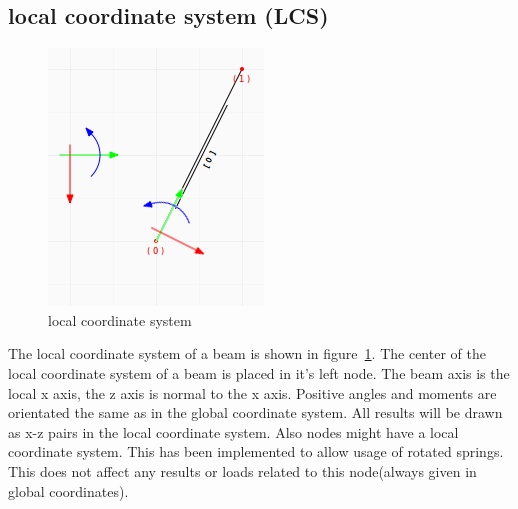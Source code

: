 \documentclass[a4paper,11pt]{report}
\begin{document}
\subsection{local coordinate system (LCS)}

\begin{minipage}[h]{6.5cm}
\begin{figure}[H]
\begin{center}
\includegraphics[width=\textwidth]{../pictures/localsys_raw.png}
\caption{local coordinate system}
\label{pic:localcoordsystem}
\end{center}
\end{figure}
\end{minipage}
\hfill
\begin{minipage}[h]{\textwidth-7.5cm}
The local coordinate system of a beam is shown in figure~\ref{pic:localcoordsystem}. The center of the local coordinate system of a beam is placed in it's left node. The beam axis is the local x axis, the z axis is normal to the x axis. Positive angles and moments are orientated the same as in the global coordinate system. All results will be drawn as x-z pairs in the local coordinate system. Also nodes might have a local coordinate system. This has been implemented to allow usage of rotated springs. This does not affect any results or loads related to this node(always given in global coordinates).
\end{minipage}
\end{document}
